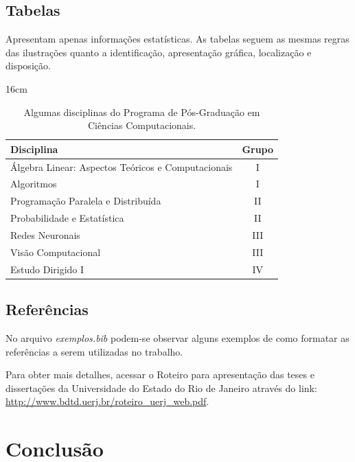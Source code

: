 \documentclass[a4paper,12pt,oneside,onecolumn,final,fleqn]{repUERJ}
\begin{document}
\section{Tabelas}

Apresentam apenas informações estatísticas. As tabelas seguem as mesmas regras das ilustrações quanto a identificação, apresentação gráfica, localização e disposição.

\begin{table}[htb]{16cm}
    \caption{\protect Algumas disciplinas do Programa de Pós-Graduação em Ciências Computacionais.}
    \label{tab:casos_sarampo}
    \hfill\begin{tabular}{l|c}
        Disciplina & Grupo \\
        \hline 
         Álgebra Linear: Aspectos Teóricos e Computacionais & I\\
         Algoritmos & I\\
         Programação Paralela e Distribuída & II\\
         Probabilidade e Estatística & II\\
         Redes Neuronais & III\\
         Visão Computacional & III\\
         Estudo Dirigido I & IV
    \end{tabular}\hfill
\end{table}


\section{Referências}

No arquivo \textit{exemplos.bib} podem-se observar alguns exemplos de como formatar as referências a serem utilizadas no trabalho. 

Para obter mais detalhes, acessar o Roteiro para apresentação das teses e dissertações da Universidade do Estado do Rio de Janeiro através do link: \url{http://www.bdtd.uerj.br/roteiro_uerj_web.pdf}.

\chapter*{Conclusão} %
\end{document}
